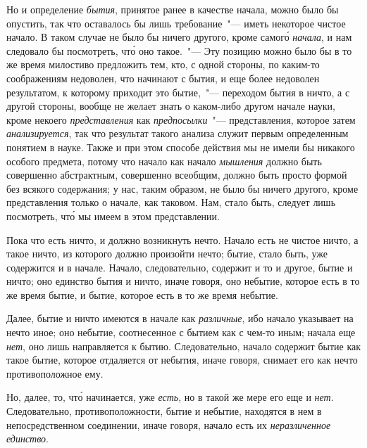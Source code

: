 Но и определение \emph{бытия}, принятое ранее в качестве
начала, можно было бы опустить, так что оставалось бы
лишь требование~"--- иметь некоторое чистое начало. В таком
случае не было бы ничего другого, кроме самог\'о
\emph{начала}, и нам следовало бы посмотреть, чт\'о оно такое.~"---
Эту позицию можно было бы в то же время милостиво
предложить тем, кто, с одной стороны, по каким-то соображениям
недоволен, что начинают с бытия, и еще более
недоволен результатом, к которому приходит это
бытие,~"--- переходом бытия в ничто, а с другой стороны,
вообще не желает знать о каком-либо другом начале
науки, кроме некоего \emph{представления} как \emph{предпосылки}~"---
представления, которое затем \emph{анализируется}, так что результат
такого анализа служит первым определенным
понятием в науке. Также и при этом способе действия
мы не имели бы никакого особого предмета, потому что
начало как начало \emph{мышления} должно быть совершенно
абстрактным, совершенно всеобщим, должно быть просто
формой без всякого содержания; у нас, таким образом,
не было бы ничего другого, кроме представления только
о начале, как таковом. Нам, стало быть, следует лишь
посмотреть, чт\'о мы имеем в этом представлении.

Пока что есть ничто, и должно возникнуть нечто. Начало
есть не чистое ничто, а такое ничто, из которого
должно произойти нечто; бытие, стало быть, уже содержится
и в начале. Начало, следовательно, содержит и то
и другое, бытие и ничто; оно единство бытия и ничто,
иначе говоря, оно небытие, которое есть в то же время
бытие, и бытие, которое есть в то же время небытие.

Далее, бытие и ничто имеются в начале как \emph{различные},
ибо начало указывает на нечто иное; оно небытие,
соотнесенное с бытием как с чем-то иным; начала еще
\emph{нет}, оно лишь направляется к бытию. Следовательно, начало
содержит бытие как такое бытие, которое отдаляется
от небытия, иначе говоря, снимает его как нечто противоположное
ему.

Но, далее, то, чт\'о начинается, уже \emph{есть}, но в такой
же мере его еще и \emph{нет}. Следовательно, противоположности,
бытие и небытие, находятся в нем в непосредственном
соединении, иначе говоря, начало есть их \emph{неразличенное
единство}.

